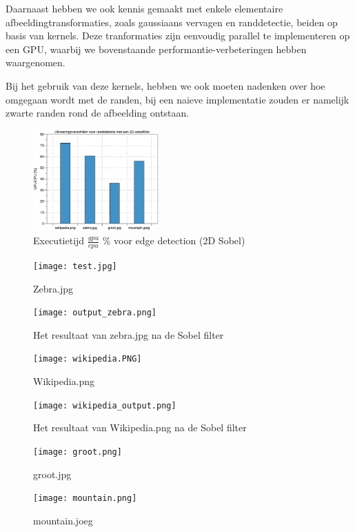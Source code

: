 \documentclass[10pt, twocolumn, a4paper]{article}
\begin{document}
Daarnaast hebben we ook kennis gemaakt met enkele elementaire afbeeldingtransformaties, zoals gaussiaans vervagen en randdetectie, beiden op basis van kernels. Deze tranformaties zijn eenvoudig parallel te implementeren op een GPU, waarbij we bovenstaande performantie-verbeteringen hebben waargenomen.

Bij het gebruik van deze kernels, hebben we ook moeten nadenken over hoe omgegaan wordt met de randen, bij een naieve implementatie zouden er namelijk zwarte randen rond de afbeelding ontstaan.

\begin{figure}[H]
    \centering
    \includegraphics[width=0.43\textwidth]{edge_detection.eps}
    \caption{Executietijd $\frac{gpu}{cpu}$ \% voor edge detection (2D Sobel)}
    \label{blocksize}
\end{figure}


\onecolumn

\appendix
\begin{figure}[H]
    \centering
    \texttt{[image: test.jpg]}
    \caption{Zebra.jpg}
    \label{blocksize}
\end{figure}
\begin{figure}[H]
    \centering
    \texttt{[image: output\_zebra.png]}
    \caption{Het resultaat van zebra.jpg na de Sobel filter}
    \label{blocksize}
\end{figure}

\begin{figure}[H]
    \centering
    \texttt{[image: wikipedia.PNG]}
    \caption{Wikipedia.png}
    \label{blocksize}
\end{figure}
\begin{figure}[H]
    \centering
    \texttt{[image: wikipedia\_output.png]}
    \caption{Het resultaat van Wikipedia.png na de Sobel filter}
    \label{blocksize}
\end{figure}

\begin{figure}[H]
    \centering
    \texttt{[image: groot.png]}
    \caption{groot.jpg}
    \label{blocksize}
\end{figure}
\begin{figure}[H]
    \centering
    \texttt{[image: mountain.png]}
    \caption{mountain.joeg}
    \label{blocksize}
\end{figure}

\newpage

\inputminted[tabsize=4,obeytabs]{c}{labo2.c}
\newpage
\inputminted[tabsize=4,obeytabs]{c}{labo2_gray.c}

\end{document}
